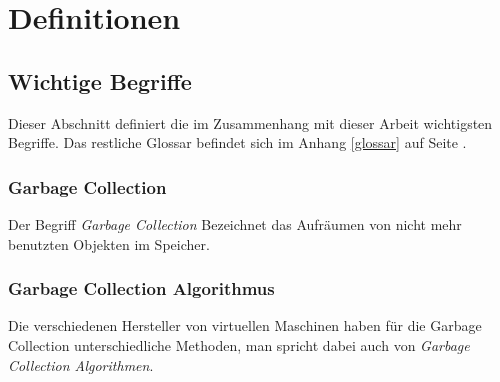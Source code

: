 \chapter{Definitionen}
\section*{Wichtige Begriffe}
Dieser Abschnitt definiert die im Zusammenhang mit dieser Arbeit wichtigsten Begriffe. Das restliche Glossar befindet sich im Anhang \ref{glossar} auf Seite \pageref{glossar}.
\subsection*{Garbage Collection}
Der Begriff \textit{Garbage Collection} Bezeichnet das Aufräumen von nicht mehr benutzten Objekten im Speicher.
\subsection*{Garbage Collection Algorithmus }
Die verschiedenen Hersteller von virtuellen Maschinen haben für die Garbage Collection unterschiedliche Methoden, man spricht dabei auch von \textit{Garbage Collection Algorithmen}. 